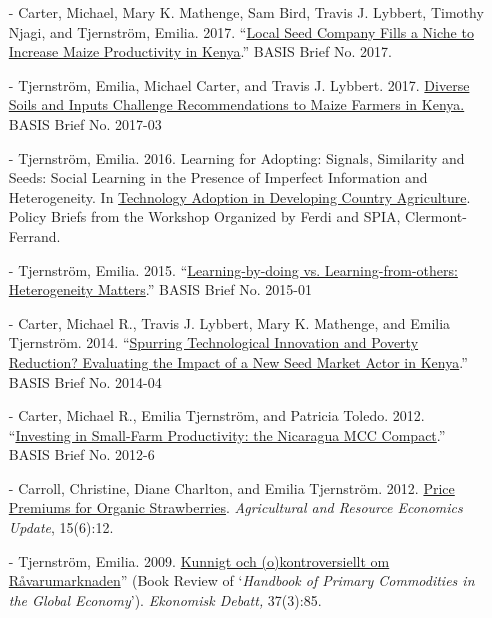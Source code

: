 \documentclass[11pt]{article}
\begin{document}
\begin{itemize}[itemsep=0pt, leftmargin=20pt]
\item [-]Carter, Michael, Mary K. Mathenge, Sam Bird, Travis J. Lybbert,
Timothy Njagi, and Tjernstr\"{o}m, Emilia. 2017. \textquotedblleft \href{https://basis.ucdavis.edu/sites/g/files/dgvnsk466/files/2017-02/AMA\%20Brief\%20-\%20WSC\%20maize\%20productivity\%20-\%202017-01.pdf}{Local Seed Company Fills a Niche to Increase Maize Productivity in Kenya}.\textquotedblright{}
BASIS Brief No. 2017.
\item [-]Tjernstr\"{o}m, Emilia, Michael Carter, and Travis J. Lybbert. 2017. \href{https://basis.ucdavis.edu/sites/g/files/dgvnsk466/files/2017-02/AMA\%20Brief\%20-\%20soil\%20variation\%20-\%202017-03.pdf}{Diverse Soils and Inputs Challenge Recommendations to Maize Farmers in Kenya.} BASIS Brief No. 2017-03 
\item [-]Tjernstr\"{o}m, Emilia. 2016. Learning for Adopting:
Signals, Similarity and Seeds: Social Learning in the Presence of
Imperfect Information and Heterogeneity. In \href{http://impact.cgiar.org/sites/default/files/pdf/Learning\%20for\%20adoption_monograph.pdf}{Technology Adoption in Developing Country Agriculture}. Policy Briefs from the Workshop Organized by Ferdi and SPIA, Clermont-Ferrand.
\item [-]Tjernstr\"{o}m, Emilia. 2015. ``\href{http://basis.ucdavis.edu/sites/g/files/dgvnsk466/files/2017-01/Tjernstrom-Brief.pdf}{Learning-by-doing vs. Learning-from-others: Heterogeneity Matters}.''
BASIS Brief No. 2015-01
\item [-]Carter, Michael R., Travis J. Lybbert, Mary K. Mathenge, and
Emilia Tjernstr\"{o}m. 2014. ``\href{http://basis.ucdavis.edu/wp-content/uploads/2014/04/Carter_WesternSeed1.pdf}{Spurring Technological Innovation and Poverty Reduction? Evaluating the Impact of a New Seed Market Actor in Kenya}.''
BASIS Brief No. 2014-04
\item [-]Carter, Michael R., Emilia Tjernstr\"{o}m, and Patricia Toledo.
2012. ``\href{http://basis.ucdavis.edu/sites/g/files/dgvnsk466/files/2017-02/Nicaragua_FINAL2.pdf}{Investing in Small-Farm Productivity: the Nicaragua MCC Compact}.'' BASIS Brief No. 2012-6
\item [-]Carroll, Christine, Diane Charlton, and Emilia Tjernstr\"{o}m. 2012.
\href{http://giannini.ucop.edu/media/are-update/files/articles/V15N6_4.pdf}{Price Premiums for Organic Strawberries}. \emph{Agricultural and Resource Economics Update}, 15(6):12.
\item [-]Tjernstr\"{o}m, Emilia. 2009. \href{http://nationalekonomi.se/filer/pdf/37-3-et.pdf}{Kunnigt och (o)kontroversiellt om R\aa  varumarknaden}''
(Book Review of \textquoteleft \emph{Handbook of Primary Commodities
in the Global Economy}\textquoteright ). \emph{Ekonomisk Debatt,}
37(3):85. 
\end{itemize}
\end{document}
